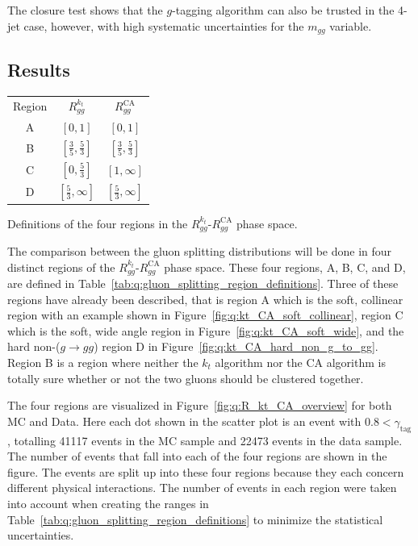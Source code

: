 The closure test shows that the $g$-tagging algorithm can also be trusted in the 4-jet case, however, with high systematic uncertainties for the $m_{gg}$ variable. 

\subsection{Results}
\label{subsec:q:gluon_splitting_results}

\begin{margintable}[1cm]
  \centerfloat
  \begin{tabular}{@{}ccc@{}}
  Region  & $R_{gg}^{k_t}$                & $R_{gg}^\mathrm{CA}$    \\ \addlinespace[0.1em] \midrule \addlinespace[0.4em]
  A       & $[0, 1]$                      & $[0, 1]$                \\ \addlinespace[0.4em]
  B       & $[\frac{3}{5}, \frac{5}{3}]$  & $[\frac{3}{5}, \frac{5}{3}]$            \\ \addlinespace[0.4em]
  C       & $[0, \frac{5}{3}]$            & $[1, \infty]$           \\ \addlinespace[0.4em]
  D       & $[\frac{5}{3}, \infty]$       & $[\frac{5}{3}, \infty]$
  \end{tabular}
\vspace{3mm}
\caption[Rgion Definition in the $R_{gg}^{k_t}$-$R_{gg}^\mathrm{CA}$ Phase Space]{\label{tab:q:gluon_splitting_region_definitions}Definitions of the four regions in the $R_{gg}^{k_t}$-$R_{gg}^\mathrm{CA}$ phase space.}
\end{margintable}

The comparison between the gluon splitting distributions will be done in four distinct regions of the $R_{gg}^{k_t}$-$R_{gg}^\mathrm{CA}$ phase space. These four regions, A, B, C, and D, are defined in Table~\ref{tab:q:gluon_splitting_region_definitions}. Three of these regions have already been described, that is region A which is the soft, collinear region with an example shown in Figure~\ref{fig:q:kt_CA_soft_collinear}, region C which is the soft, wide angle region in Figure~\ref{fig:q:kt_CA_soft_wide}, and the hard non-($g\rightarrow gg$) region D in Figure~\ref{fig:q:kt_CA_hard_non_g_to_gg}. Region B is a region where neither the $k_t$ algorithm nor the CA algorithm is totally sure whether or not the two gluons should be clustered together. 

The four regions are visualized in Figure~\ref{fig:q:R_kt_CA_overview} for both MC and Data. Here each dot shown in the scatter plot is an event with $0.8 < \gamma_\mathrm{tag}$, totalling \num{41117} events in the MC sample and \num{22473} events in the data sample. The number of events that fall into each of the four regions are shown in the figure. The events are split up into these four regions because they each concern different physical interactions. The number of events in each region were taken into account when creating the ranges in Table~\ref{tab:q:gluon_splitting_region_definitions} to minimize the statistical uncertainties. 


